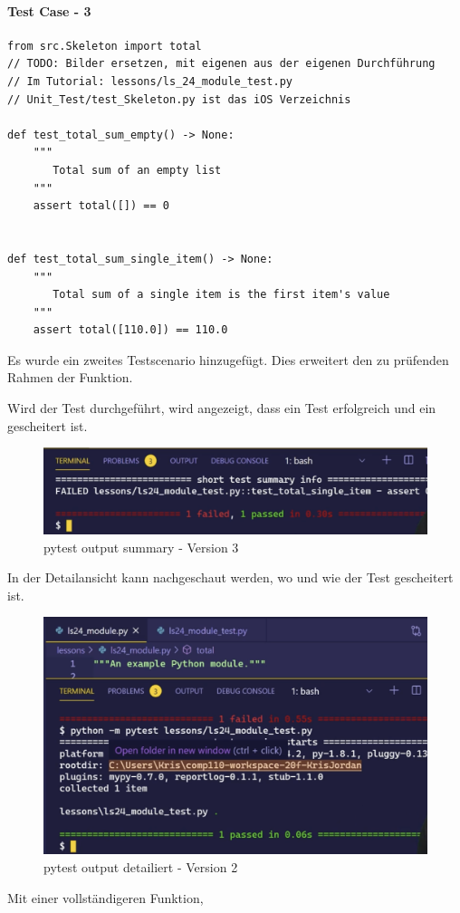\paragraph{Test Case - 3}

\begin{lstlisting}[style=python, caption={Unit Test - Version 3; Skeleton-test.py}, captionpos=b]
from src.Skeleton import total
// TODO: Bilder ersetzen, mit eigenen aus der eigenen Durchführung
// Im Tutorial: lessons/ls_24_module_test.py
// Unit_Test/test_Skeleton.py ist das iOS Verzeichnis

def test_total_sum_empty() -> None:
    """
       Total sum of an empty list
    """
	assert total([]) == 0
	

def test_total_sum_single_item() -> None:
    """
       Total sum of a single item is the first item's value
    """
	assert total([110.0]) == 110.0

\end{lstlisting}
Es wurde ein zweites Testscenario hinzugefügt. Dies erweitert den zu prüfenden Rahmen der Funktion.

Wird der Test durchgeführt, wird angezeigt, dass ein Test erfolgreich und ein gescheitert ist.
\begin{figure}[H]
	\centering
	\includegraphics[scale = 0.6]{attachment/chapter_2/Scc087}
	\caption{pytest output summary - Version 3}
\end{figure}

In der Detailansicht kann nachgeschaut werden, wo und wie der Test gescheitert ist.

\begin{figure}[H]
	\centering
	\includegraphics[scale = 0.6]{attachment/chapter_2/Scc086}
	\caption{pytest output detailiert - Version 2}
\end{figure}
Mit einer vollständigeren Funktion,

